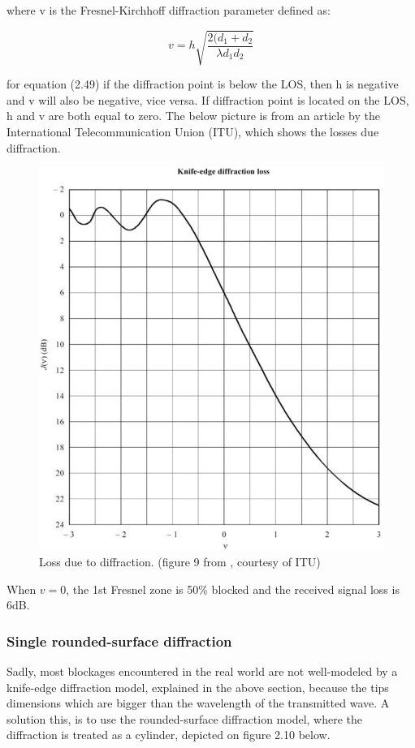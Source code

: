 where v is the Fresnel-Kirchhoff diffraction parameter defined as:

\begin{equation}
    v = h \sqrt{\frac{2(d_1+d_2}{\lambda d_1d_2}}
\end{equation}

for equation (2.49) if the diffraction point is below the LOS, then h is negative and v will also be negative, vice versa. If diffraction point is located on the LOS, h and v are both equal to zero. The below picture is from an article by the International Telecommunication Union (ITU)\cite{ITU}, which shows the losses due diffraction.

\begin{figure}[h]
\hspace{0.5cm}
\includegraphics[scale=0.7]{figures/DiffractionLoss.PNG}
\caption{Loss due to diffraction. (figure 9 from \cite{ITU-R}, courtesy of ITU)}
\end{figure}

When $v=0$, the 1st Fresnel zone is 50\% blocked and the received signal loss is 6dB. 

\subsubsection{Single rounded-surface diffraction}
Sadly, most blockages encountered in the real world are not well-modeled by a knife-edge diffraction model, explained in the above section, because the tips dimensions which are bigger than the wavelength of the transmitted wave. A solution this, is to use the rounded-surface diffraction model, where the diffraction is treated as a cylinder, depicted on figure 2.10 below. 

